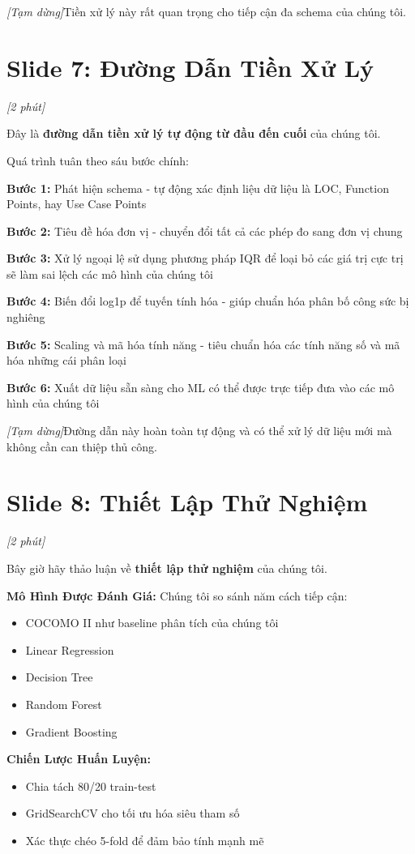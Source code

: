 \documentclass[12pt,a4paper]{article}
\newcommand{\slide}[1]{\section*{\textcolor{slidenum}{Slide #1}}}
\newcommand{\timing}[1]{\textcolor{timing}{\textit{[#1]}}}
\newcommand{\keypoint}[1]{\textcolor{keypoint}{\textbf{#1}}}
\newcommand{\pause}{\textit{[Tạm dừng]}}
\begin{document}
\pause Tiền xử lý này rất quan trọng cho tiếp cận đa schema của chúng tôi.

\slide{7: Đường Dẫn Tiền Xử Lý}
\timing{2 phút}

Đây là \keypoint{đường dẫn tiền xử lý tự động từ đầu đến cuối} của chúng tôi.

Quá trình tuân theo sáu bước chính:

\textbf{Bước 1:} Phát hiện schema - tự động xác định liệu dữ liệu là LOC, Function Points, hay Use Case Points

\textbf{Bước 2:} Tiêu đề hóa đơn vị - chuyển đổi tất cả các phép đo sang đơn vị chung

\textbf{Bước 3:} Xử lý ngoại lệ sử dụng phương pháp IQR để loại bỏ các giá trị cực trị sẽ làm sai lệch các mô hình của chúng tôi

\textbf{Bước 4:} Biến đổi log1p để tuyến tính hóa - giúp chuẩn hóa phân bố công sức bị nghiêng

\textbf{Bước 5:} Scaling và mã hóa tính năng - tiêu chuẩn hóa các tính năng số và mã hóa những cái phân loại

\textbf{Bước 6:} Xuất dữ liệu sẵn sàng cho ML có thể được trực tiếp đưa vào các mô hình của chúng tôi

\pause Đường dẫn này hoàn toàn tự động và có thể xử lý dữ liệu mới mà không cần can thiệp thủ công.

\slide{8: Thiết Lập Thử Nghiệm}
\timing{2 phút}

Bây giờ hãy thảo luận về \keypoint{thiết lập thử nghiệm} của chúng tôi.

\textbf{Mô Hình Được Đánh Giá:}
Chúng tôi so sánh năm cách tiếp cận:
\begin{itemize}
    \item COCOMO II như baseline phân tích của chúng tôi
    \item Linear Regression
    \item Decision Tree
    \item Random Forest
    \item Gradient Boosting
\end{itemize}

\textbf{Chiến Lược Huấn Luyện:}
\begin{itemize}
    \item Chia tách 80/20 train-test
    \item GridSearchCV cho tối ưu hóa siêu tham số
    \item Xác thực chéo 5-fold để đảm bảo tính mạnh mẽ
\end{itemize}
\end{document}

